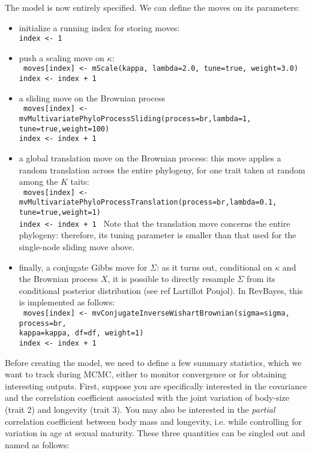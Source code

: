 \documentclass[usletter]{article}
\newcommand{\cmd}[1]{\texttt{#1}}
\begin{document}
The model is now entirely specified. We can define the moves on its parameters:
\begin{itemize}
\item
initialize a running index for storing moves:
\\
\cmd{index <- 1}
\item
push a scaling move on $\kappa$:
\\
\cmd{
moves[index] <- mScale(kappa, lambda=2.0, tune=true, weight=3.0)
\\
index <- index + 1
}
\item
a sliding move on the Brownian process
\\
\cmd{
moves[index] <- mvMultivariatePhyloProcessSliding(process=br,lambda=1,
\\
tune=true,weight=100)
\\
index <- index + 1
}
\item
a global translation move on the Brownian process: this move applies a random translation across the entire phylogeny, for one trait taken at random among the $K$ taits:
\\
\cmd{
moves[index] <- mvMultivariatePhyloProcessTranslation(process=br,lambda=0.1,
\\
tune=true,weight=1)
\\
index <- index + 1
}
Note that the translation move concerns the entire phylogeny: therefore, its tuning parameter is smaller than that used for the single-node sliding move above.
\item
finally, a conjugate Gibbs move for $\Sigma$: as it turns out, conditional on $\kappa$ and the Brownian process $X$, it is possible to directly resample $\Sigma$ from its conditional posterior distribution (see ref Lartillot Poujol). In RevBayes, this is implemented as follows:
\\
\cmd{
moves[index] <- mvConjugateInverseWishartBrownian(sigma=sigma, process=br,
\\
kappa=kappa, df=df, weight=1)
\\
index <- index + 1
}
\end{itemize}
Before creating the model, we need to define a few summary statistics, which we want to track during MCMC, either to monitor convergence or for obtaining interesting outputs.
First, suppose you are specifically interested in the covariance and the correlation coefficient associated with the joint variation of body-size (trait 2) and longevity (trait 3). You may also be interested in the \emph{partial} correlation coefficient between body mass and longevity, i.e. while controlling for variation in age at sexual maturity. These three quantities can be singled out and named as follows:
\end{document}

